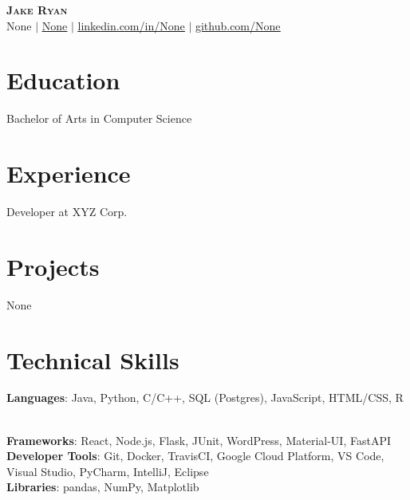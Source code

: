 \documentclass[letterpaper,11pt]{article}
\newcommand{\resumeSubHeadingListStart}{\begin{itemize}[leftmargin=0.15in, label={}]}
\newcommand{\resumeSubHeadingListEnd}{\end{itemize}}
\begin{document}
    \begin{center}
        \textbf{\Huge \scshape Jake Ryan} \\ \vspace{1pt}
        \small None $|$ \href{mailto:None}{\underline{None}} $|$ 
        \href{https://linkedin.com/in/None}{\underline{linkedin.com/in/None}} $|$
        \href{https://github.com/None}{\underline{github.com/None}}
    \end{center}

    \section{Education}
    \resumeSubHeadingListStart
        Bachelor of Arts in Computer Science
    \resumeSubHeadingListEnd

    \section{Experience}
    \resumeSubHeadingListStart
        Developer at XYZ Corp.
    \resumeSubHeadingListEnd

    \section{Projects}
    \resumeSubHeadingListStart
        None
    \resumeSubHeadingListEnd

    \section{Technical Skills}
    \begin{itemize}[leftmargin=0.15in, label={}]
        \small{\item{\textbf{Languages}{: Java, Python, C/C++, SQL (Postgres), JavaScript, HTML/CSS, R}}} \\
        \textbf{Frameworks}{: React, Node.js, Flask, JUnit, WordPress, Material-UI, FastAPI} \\
        \textbf{Developer Tools}{: Git, Docker, TravisCI, Google Cloud Platform, VS Code, Visual Studio, PyCharm, IntelliJ, Eclipse} \\
        \textbf{Libraries}{: pandas, NumPy, Matplotlib}
    \end{itemize}

    
\end{document}
